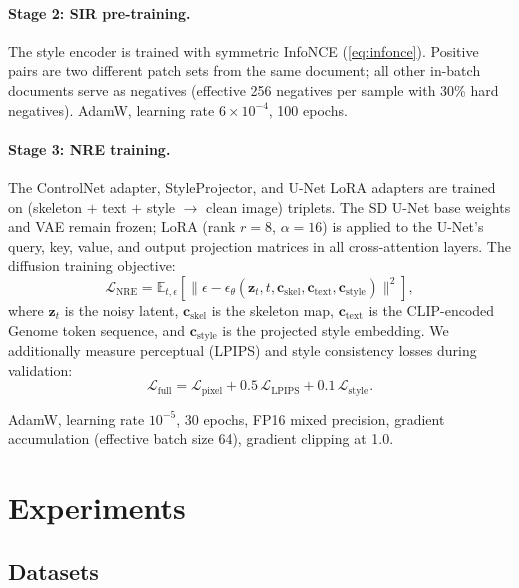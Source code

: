 \documentclass[conference]{IEEEtran}
\begin{document}
\paragraph{Stage 2: SIR pre-training.}
The style encoder is trained with symmetric InfoNCE (\cref{eq:infonce}).
Positive pairs are two different patch sets from the same document; all other
in-batch documents serve as negatives (effective 256 negatives per sample with
30\% hard negatives).
AdamW, learning rate $6{\times}10^{-4}$, 100 epochs.

\paragraph{Stage 3: NRE training.}
The ControlNet adapter, StyleProjector, and U-Net LoRA adapters are trained on
(skeleton $+$ text $+$ style $\rightarrow$ clean image) triplets.  The SD U-Net
base weights and VAE remain frozen; LoRA (rank $r{=}8$, $\alpha{=}16$) is applied
to the U-Net's query, key, value, and output projection matrices in all
cross-attention layers.
The diffusion training objective:
\begin{equation}
  \mathcal{L}_\text{NRE} = \mathbb{E}_{t, \epsilon}\left[
    \|\epsilon - \epsilon_\theta(\mathbf{z}_t, t, \mathbf{c}_\text{skel},
      \mathbf{c}_\text{text}, \mathbf{c}_\text{style})\|^2
  \right],
  \label{eq:nre_loss}
\end{equation}
where $\mathbf{z}_t$ is the noisy latent, $\mathbf{c}_\text{skel}$ is the skeleton
map, $\mathbf{c}_\text{text}$ is the CLIP-encoded Genome token sequence, and
$\mathbf{c}_\text{style}$ is the projected style embedding.  We additionally
measure perceptual (LPIPS) and style consistency losses during validation:
\begin{equation}
  \mathcal{L}_\text{full} = \mathcal{L}_\text{pixel} + 0.5\,\mathcal{L}_\text{LPIPS}
    + 0.1\,\mathcal{L}_\text{style}.
  \label{eq:nre_full}
\end{equation}

AdamW, learning rate $10^{-5}$, 30 epochs, FP16 mixed precision, gradient
accumulation (effective batch size 64), gradient clipping at 1.0.

\section{Experiments}
\label{sec:experiments}

\subsection{Datasets}
\label{sec:datasets}
\end{document}
